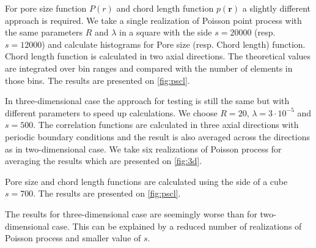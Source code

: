 \documentclass[reprint,amsmath,amssymb,aps,pre,showkeys,showpacs,nofootinbib]{revtex4-1}
\begin{document}
For pore size function $P(r)$ and chord length function $p(\bm{r})$ a slightly
different approach is required. We take a single realization of Poisson point
process with the same parameters $R$ and $\lambda$ in a square with the side
$s = 20000$ (resp. $s = 12000$) and calculate histograms for Pore size
(resp. Chord length) function. Chord length function is calculated in two axial
directions. The theoretical values are integrated over bin ranges and compared
with the number of elements in those bins. The results are presented on
\cref{fig:pscl}.

In three-dimensional case the approach for testing is still the same but with
different parameters to speed up calculations. We choose $R = 20$,
$\lambda = 3\cdot10^{-5}$ and $s = 500$. The correlation functions are
calculated in three axial directions with periodic boundary conditions and the
result is also averaged across the directions as in two-dimensional
case. We take six realizations of Poisson process for averaging the results
which are presented on \cref{fig:3d}.

Pore size and chord length functions are calculated using the side of a cube
$s = 700$. The results are presented on \cref{fig:pscl}.

The results for three-dimensional case are seemingly worse than for
two-dimensional case. This can be explained by a reduced number of realizations
of Poisson process and smaller value of $s$.
\end{document}
